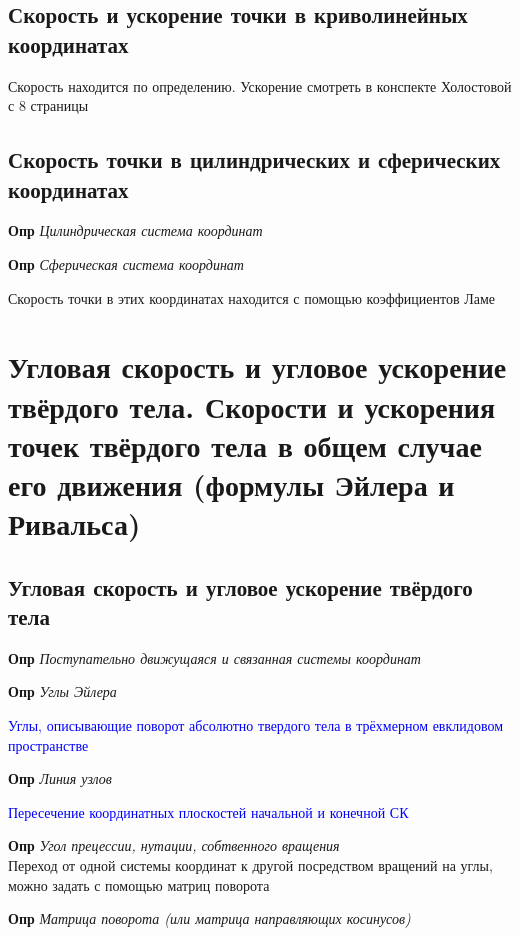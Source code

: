 \documentclass[a4paper, 14pt]{article}
\begin{document}
    \subsection{Скорость и ускорение точки в криволинейных координатах}
    
    Скорость находится по определению.
    Ускорение смотреть в конспекте Холостовой с 8 страницы
    
    \subsection{Скорость точки в цилиндрических и сферических координатах}
    
    \textbf{Опр} \textit{Цилиндрическая система координат}
    
    \textbf{Опр} \textit{Сферическая система координат}
    
    Скорость точки в этих координатах находится с помощью коэффициентов Ламе
    
    \section{Угловая скорость и угловое ускорение твёрдого тела.
    Скорости и ускорения точек твёрдого тела в общем случае его движения (формулы Эйлера и Ривальса)}
    
    \subsection{Угловая скорость и угловое ускорение твёрдого тела}
    
    \textbf{Опр} \textit{Поступательно движущаяся и связанная системы координат}
    
    \textbf{Опр} \textit{Углы Эйлера}
    
    \textcolor{blue}{Углы, описывающие поворот абсолютно твердого тела в трёхмерном евклидовом пространстве}
    
    \textbf{Опр} \textit{Линия узлов}
    
    \textcolor{blue}{Пересечение координатных плоскостей начальной и конечной СК}
    
    \textbf{Опр} \textit{Угол прецессии, нутации, собтвенного вращения} \\
    
    Переход от одной системы координат к другой посредством вращений на углы, можно задать с помощью матриц поворота
    
    \textbf{Опр} \textit{Матрица поворота (или матрица направляющих косинусов)}
    
\end{document}
